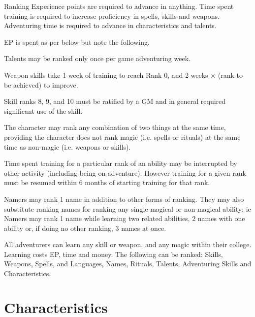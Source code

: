 \begin{Chapter}{Ranking}
\label{table:ranking}
Experience points are required to advance in anything.  Time spent
training is required to increase proficiency in spells, skills and
weapons.  Adventuring time is required to advance in characteristics
and talents.

EP is spent as per below but note the following.

\begin{Itemize}
  
\item Talents may be ranked only once per game adventuring week.

\item Weapon skills take 1 week of training to reach Rank 0, and 2
  weeks × (rank to be achieved) to improve.

\item Skill ranks 8, 9, and 10 must be ratified by a GM and in general
  required significant use of the skill.

\item The character may rank any combination of two things at the same
  time, providing the character does not rank magic (i.e.  spells or
  rituals) at the same time as non-magic (i.e. weapons or skills).

\item Time spent training for a particular rank of an ability may be
  interrupted by other activity (including being on adventure).
  However training for a given rank must be resumed within 6 months of
  starting training for that rank.

\item Namers may rank 1 name in addition to other forms of
  ranking. They may also substitute ranking names for ranking any
  single magical or non-magical ability; ie Namers may rank 1 name
  while learning two related abilities, 2 names with one ability or,
  if doing no other ranking, 3 names at once.

\end{Itemize}

All adventurers can learn any skill or weapon, and any magic within
their college. Learning costs EP, time and money.  The following can
be ranked: Skills, Weapons, Spells, and Languages, Names, Rituals,
Talents, Adventuring Skills and Characteristics.

\section{Characteristics}


\end{Chapter}
